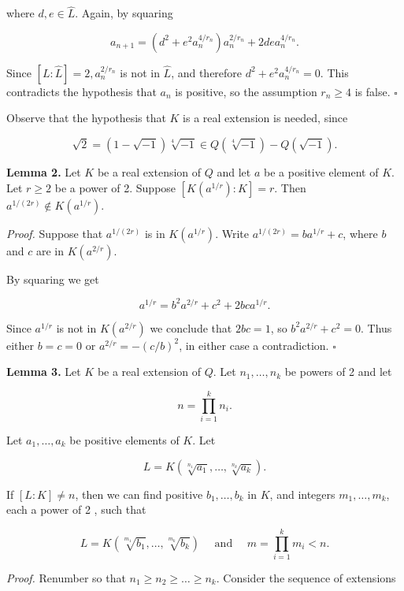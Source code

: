 \documentclass[11pt,letterpaper]{article}
\begin{document}
where $d, e \in \hat{L}$. Again, by squaring

\[
a_{n+1}=\left(d^{2}+e^{2} a_{n}^{4 / r_{n}}\right) a_{n}^{2 / r_{n}}+2 d e a_{n}^{4 / r_{n}} .
\]

Since $[L: \hat{L}]=2, a_{n}^{2 / r_{n}}$ is not in $\hat{L}$, and therefore $d^{2}+e^{2} a_{n}^{4 / r_{n}}=0$. This contradicts the hypothesis that $a_{n}$ is positive, so the assumption $r_{n} \geqslant 4$ is false. \(\square\)

Observe that the hypothesis that $K$ is a real extension is needed, since

\[
\sqrt{2}=(1-\sqrt{-1}) \sqrt[4]{-1} \in Q(\sqrt[4]{-1})-Q(\sqrt{-1}) .
\]

\noindent\textbf{Lemma 2.} Let $K$ be a real extension of $Q$ and let $a$ be a positive element of $K$. Let $r \geqslant 2$ be a power of 2. Suppose $\left[K\left(a^{1 / r}\right): K\right]=r$. Then $a^{1/(2r)} \notin K\left(a^{1 / r}\right)$.

\noindent\textit{Proof.} Suppose that $a^{1/(2r)}$ is in $K\left(a^{1 / r}\right)$. Write $a^{1/(2r)}=b a^{1 / r}+c$, where $b$ and $c$ are in $K\left(a^{2 / r}\right)$.

By squaring we get

\[
a^{1 / r}=b^{2} a^{2 / r}+c^{2}+2 b c a^{1 / r} .
\]

Since $a^{1 / r}$ is not in $K\left(a^{2 / r}\right)$ we conclude that $2 b c=1$, so $b^{2} a^{2 / r}+c^{2}=0$. Thus either $b=c=0$ or $a^{2 / r}=-(c / b)^{2}$, in either case a contradiction. \(\square\)

\noindent\textbf{Lemma 3.} Let $K$ be a real extension of $Q$. Let $n_{1}, \ldots, n_{k}$ be powers of 2 and let

\[
n=\prod_{i=1}^{k} n_{i} .
\]

Let $a_{1}, \ldots, a_{k}$ be positive elements of $K$. Let

\[
L=K\left(\sqrt[n_{1}]{a_{1}}, \ldots, \sqrt[n_{k}]{a_{k}}\right) .
\]

If $[L: K] \neq n$, then we can find positive $b_{1}, \ldots, b_{k}$ in $K$, and integers $m_{1}, \ldots, m_{k}$, each a power of 2 , such that

\[
L=K\left(\sqrt[m_{1}]{b_{1}}, \ldots, \sqrt[m_{k}]{b_{k}}\right) \quad \text { and } \quad m=\prod_{i=1}^{k} m_{i}<n .
\]

\noindent\textit{Proof.} Renumber so that $n_{1} \geqslant n_{2} \geqslant \ldots \geqslant n_{k}$. Consider the sequence of extensions
\end{document}

